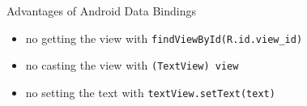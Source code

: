 \begin{frame}[fragile]{Advantages of Android Data Bindings}
\begin{itemize}
  \item<+-> no getting the view with \lstinline`findViewById(R.id.view_id)`
  \item<+-> no casting the view with \lstinline`(TextView) view`
  \item<+-> no setting the text with \lstinline`textView.setText(text)`
\end{itemize}
\end{frame}
